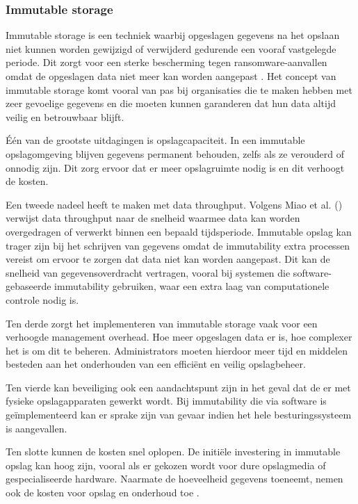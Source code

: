 \subsubsection{Immutable storage}
Immutable storage is een techniek waarbij opgeslagen gegevens na het opslaan niet kunnen worden gewijzigd of verwijderd gedurende een vooraf vastgelegde periode. Dit zorgt voor een sterke bescherming tegen ransomware-aanvallen omdat de opgeslagen data niet meer kan worden aangepast \autocite{Wahl2023}. Het concept van immutable storage komt vooral van pas bij organisaties die te maken hebben met zeer gevoelige gegevens en die moeten kunnen garanderen dat hun data altijd veilig en betrouwbaar blijft. 

Één van de grootste uitdagingen is opslagcapaciteit. In een immutable opslagomgeving blijven gegevens permanent behouden, zelfs als ze verouderd of onnodig zijn. Dit zorg ervoor dat er meer opslagruimte nodig is en dit verhoogt de kosten. 

Een tweede nadeel heeft te maken met data throughput. Volgens Miao et al. (\citeyear{Miao2016}) verwijst data throughput naar de snelheid waarmee data kan worden overgedragen of verwerkt binnen een bepaald tijdsperiode.
 Immutable opslag kan trager zijn bij het schrijven van gegevens omdat de immutability extra processen vereist om ervoor te zorgen dat data niet kan worden aangepast. Dit kan de snelheid van gegevensoverdracht vertragen, vooral bij systemen die software-gebaseerde immutability gebruiken, waar een extra laag van computationele controle nodig is. 

Ten derde zorgt het implementeren  van immutable storage vaak voor een verhoogde management overhead. Hoe meer opgeslagen data er is, hoe complexer het is om dit te beheren. Administrators moeten hierdoor meer tijd en middelen besteden aan het onderhouden van een efficiënt en veilig opslagbeheer. 

Ten vierde kan beveiliging ook een aandachtspunt zijn in het geval dat de er met fysieke opslagapparaten gewerkt wordt. Bij immutability die via software is geïmplementeerd kan er sprake zijn van gevaar indien het hele besturingssysteem is aangevallen. 

Ten slotte kunnen de kosten snel oplopen. De initiële investering in immutable opslag kan hoog zijn, vooral als er gekozen wordt voor dure opslagmedia of gespecialiseerde hardware. Naarmate de hoeveelheid gegevens toeneemt, nemen ook de kosten voor opslag en onderhoud toe \autocite{Hasan2005}.

